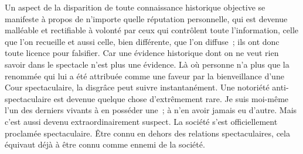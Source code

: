 \documentclass[french,twoside]{book} %
\begin{document}
Un aspect de la disparition de toute connaissance historique objective se manifeste à propos de n’importe quelle réputation personnelle, qui est devenue malléable et rectifiable à volonté par ceux qui contrôlent toute l’information, celle que l’on recueille et aussi celle, bien différente, que l’on diffuse ; ils ont donc toute licence pour falsifier. Car une évidence historique dont on ne veut rien savoir dans le spectacle n’est plus une évidence. Là où personne n’a plus que la renommée qui lui a été attribuée comme une faveur par la bienveillance d’une Cour spectaculaire, la disgrâce peut suivre instantanément. Une notoriété anti-spectaculaire est devenue quelque chose d’extrêmement rare. Je suis moi-même l’un des derniers vivants à en posséder une ; à n’en avoir jamais eu d’autre. Mais c’est aussi devenu extraordinairement suspect. La société s’est officiellement proclamée spectaculaire. Être connu en dehors des relations spectaculaires, cela équivaut déjà à être connu comme ennemi de la société.\par
\end{document}
